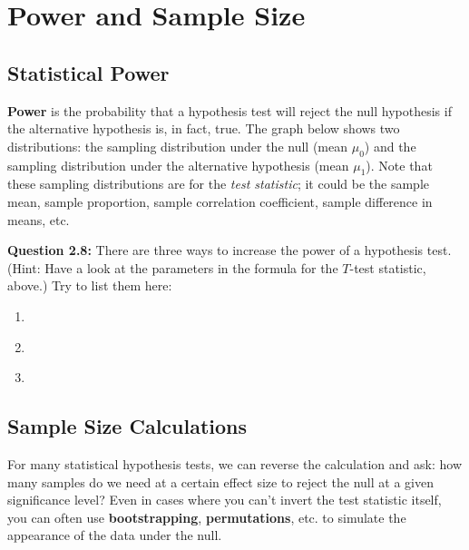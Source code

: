 \chapter{Power and Sample Size \label{chapter:powersamplesize}}


\section{Statistical Power}

\textbf{Power} is the probability that a hypothesis test will reject the null hypothesis if the alternative hypothesis is, in fact, true. The graph below shows two distributions: the sampling distribution under the null (mean $\mu_0$) and the sampling distribution under the alternative hypothesis (mean $\mu_1$). Note that these sampling distributions are for the \emph{test statistic}; it could be the sample mean, sample proportion, sample correlation coefficient, sample difference in means, etc.

\begin{center}
\end{center}

\begin{mdframed}
\textbf{Question 2.8:} There are three ways to increase the power of a hypothesis test. (Hint: Have a look at the parameters in the formula for the $T$-test statistic, above.) Try to list them here:
\begin{enumerate}
\item ~
\item ~
\item ~
\end{enumerate}
\vspace{5mm}
\end{mdframed}


\section{Sample Size Calculations}

For many statistical hypothesis tests, we can reverse the calculation and ask: how many samples do we need at a certain effect size to reject the null at a given significance level? Even in cases where you can't invert the test statistic itself, you can often use \textbf{bootstrapping}, \textbf{permutations}, etc. to simulate the appearance of the data under the null. 

